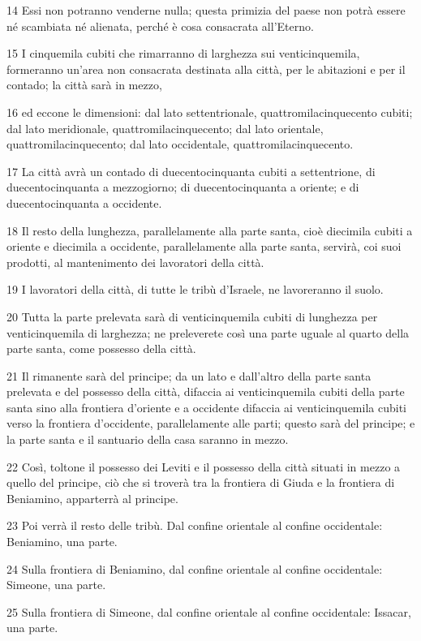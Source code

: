 \par 14 Essi non potranno venderne nulla; questa primizia del paese non potrà essere né scambiata né alienata, perché è cosa consacrata all'Eterno.
\par 15 I cinquemila cubiti che rimarranno di larghezza sui venticinquemila, formeranno un'area non consacrata destinata alla città, per le abitazioni e per il contado; la città sarà in mezzo,
\par 16 ed eccone le dimensioni: dal lato settentrionale, quattromilacinquecento cubiti; dal lato meridionale, quattromilacinquecento; dal lato orientale, quattromilacinquecento; dal lato occidentale, quattromilacinquecento.
\par 17 La città avrà un contado di duecentocinquanta cubiti a settentrione, di duecentocinquanta a mezzogiorno; di duecentocinquanta a oriente; e di duecentocinquanta a occidente.
\par 18 Il resto della lunghezza, parallelamente alla parte santa, cioè diecimila cubiti a oriente e diecimila a occidente, parallelamente alla parte santa, servirà, coi suoi prodotti, al mantenimento dei lavoratori della città.
\par 19 I lavoratori della città, di tutte le tribù d'Israele, ne lavoreranno il suolo.
\par 20 Tutta la parte prelevata sarà di venticinquemila cubiti di lunghezza per venticinquemila di larghezza; ne preleverete così una parte uguale al quarto della parte santa, come possesso della città.
\par 21 Il rimanente sarà del principe; da un lato e dall'altro della parte santa prelevata e del possesso della città, difaccia ai venticinquemila cubiti della parte santa sino alla frontiera d'oriente e a occidente difaccia ai venticinquemila cubiti verso la frontiera d'occidente, parallelamente alle parti; questo sarà del principe; e la parte santa e il santuario della casa saranno in mezzo.
\par 22 Così, toltone il possesso dei Leviti e il possesso della città situati in mezzo a quello del principe, ciò che si troverà tra la frontiera di Giuda e la frontiera di Beniamino, apparterrà al principe.
\par 23 Poi verrà il resto delle tribù. Dal confine orientale al confine occidentale: Beniamino, una parte.
\par 24 Sulla frontiera di Beniamino, dal confine orientale al confine occidentale: Simeone, una parte.
\par 25 Sulla frontiera di Simeone, dal confine orientale al confine occidentale: Issacar, una parte.
